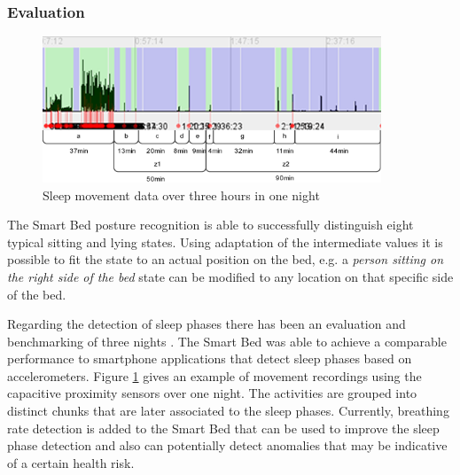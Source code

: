 \subsubsection{Evaluation}
\begin{figure}[h]
\centering
\includegraphics[width=0.9\textwidth]{images/smartbed_sleepphase}
\caption{Sleep movement data over three hours in one night \cite{Djakow2013movibed}}
\label{fig:smartbed_sleepphase}
\end{figure}
The Smart Bed posture recognition is able to successfully distinguish eight typical sitting and lying states. Using adaptation of the intermediate values it is possible to fit the state to an actual position on the bed, e.g. a \emph{person sitting on the right side of the bed} state can be modified to any location on that specific side of the bed. 

Regarding the detection of sleep phases there has been an evaluation and benchmarking of three nights \cite{Djakow2013movibed}. The Smart Bed was able to achieve a comparable performance to smartphone applications that detect sleep phases based on accelerometers. Figure \ref{fig:smartbed_sleepphase} gives an example of movement recordings using the capacitive proximity sensors over one night. The activities are grouped into distinct chunks that are later associated to the sleep phases. Currently, breathing rate detection is added to the Smart Bed that can be used to improve the sleep phase detection and also can potentially detect anomalies that may be indicative of a certain health risk.

